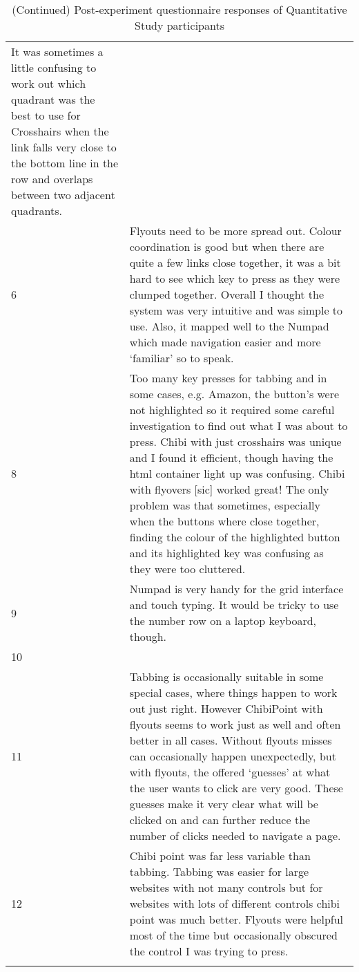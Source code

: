 \begin{longtable}{p{1cm}|p{6in}}
It was sometimes a little confusing to work out which quadrant was the best to use for Crosshairs when the link falls very close to the bottom line in the row and overlaps between two adjacent quadrants. 	\\
6	&	Flyouts need to be more spread out. Colour coordination is good but when there are quite a few links close together, it was a bit hard to see which key to press as they were clumped together. Overall I thought the system was very intuitive and was simple to use. Also, it mapped well to the Numpad which made navigation easier and more `familiar' so to speak. 	\\
8	&	Too many key presses for tabbing and in some cases, e.g. Amazon, the button's were not highlighted so it required some careful investigation to find out what I was about to press.\newline
Chibi with just crosshairs was unique and I found it efficient, though having the html container light up was confusing.\newline
Chibi with flyovers [sic] worked great!  The only problem was that sometimes, especially when the buttons where close together, finding the colour of the highlighted button and its highlighted key was confusing as they were too cluttered.	\\
9	&	Numpad is very handy for the grid interface and touch typing. It would be tricky to use the number row on a laptop keyboard, though.	\\
10	&		\\
11	&	Tabbing is occasionally suitable in some special cases, where things happen to work out just right. However ChibiPoint with flyouts seems to work just as well and often better in all cases. Without flyouts misses can occasionally happen unexpectedly, but with flyouts, the offered `guesses' at what the user wants to click are very good. These guesses make it very clear what will be clicked on and can further reduce the number of clicks needed to navigate a page. 	\\
12	&	Chibi point was far less variable than tabbing. Tabbing was easier for large websites with not many controls but for websites with lots of different controls chibi point was much better. Flyouts were helpful most of the time but occasionally obscured the control I was trying to press.	\\
\hline
\caption{(Continued) Post-experiment questionnaire responses of Quantitative Study participants}
\label{fig:quantpost_feedback}
\end{longtable}